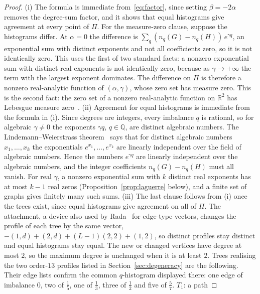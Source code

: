 \documentclass[a5paper, 10pt]{article}
\theoremstyle{plain}
\theoremstyle{remark}
\theoremstyle{definition}
\begin{document}
  \begin{proof}
  (i) The formula is immediate from~\eqref{eq:factor}, since setting
  $\beta = -2\alpha$ removes the degree-sum factor, and it shows that
  equal histograms give agreement at every point of $\Pi$. For the
  measure-zero clause, suppose the
  histograms differ. At $\alpha = 0$ the difference is
  $\sum_q (n_q(G) - n_q(H))\,e^{\gamma q}$, an exponential sum with
  distinct exponents and not all coefficients zero, so it is not
  identically zero. This uses the first of two standard facts: a nonzero
  exponential sum with distinct real exponents is not identically zero,
  because as $\gamma \to +\infty$ the term with the largest exponent
  dominates. The difference on $\Pi$ is therefore a nonzero
  real-analytic function of $(\alpha,\gamma)$, whose zero set has
  measure zero. This is the second fact: the zero set of a nonzero real-analytic function on $\mathbb{R}^2$ has Lebesgue measure zero~\cite{Mityagin2020}.
  (ii) Agreement for equal histograms is immediate from the formula in
  (i). Since degrees are integers, every imbalance $q$ is rational, so
  for algebraic $\gamma \neq 0$ the exponents
  $\gamma q$, $q \in \mathbb{Q}$, are distinct algebraic numbers. The
  Lindemann--Weierstrass theorem~\cite{Baker1975} says that for distinct
  algebraic numbers $x_1, \dots, x_k$ the exponentials
  $e^{x_1}, \dots, e^{x_k}$ are linearly independent over the field of
  algebraic numbers. Hence the numbers
  $e^{\gamma q}$ are linearly independent over the algebraic numbers,
  and the integer coefficients $n_q(G) - n_q(H)$ must all vanish. For real
  $\gamma$, a nonzero exponential sum with $k$ distinct real exponents
  has at most $k - 1$ real zeros (Proposition~\ref{prop:laguerre} below), and
  a finite set of graphs gives finitely many such sums. (iii) The last
  clause follows from (i) once the trees exist, since equal histograms
  give agreement on all of $\Pi$. The attachment, a device also used by Rada~\cite{Rada2026LinearVDB} for edge-type vectors, changes the profile of each tree by the same vector,
  $-(1,d) + (2,d) + (L-1)(2,2) + (1,2)$, so distinct profiles stay
  distinct and equal histograms stay equal. The new or changed
  vertices have degree at most $2$, so the maximum degree is unchanged
  when it is at least $2$. Trees realising the two order-$13$ profiles
  listed in Section~\ref{sec:degeneracy} are the following. Their edge
  lists confirm the common $q$-histogram displayed there: one edge of
  imbalance $0$, two of $\tfrac15$, one of $\tfrac13$, three of
  $\tfrac12$ and five of $\tfrac57$. $T_1$: a path

\end{proof}
\end{document}

